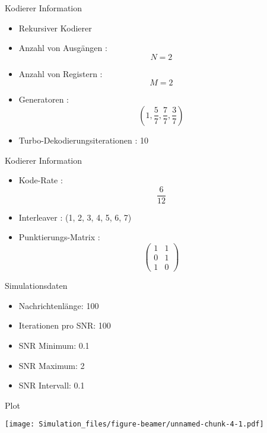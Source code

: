 \begin{frame}{Kodierer Information}

\begin{itemize}
\tightlist
\item
  Rekursiver Kodierer
\item
  Anzahl von Ausgängen : \[N=2\]
\item
  Anzahl von Registern : \[M=2\]
\item
  Generatoren : \[\left(1,\frac{5}{7},\frac{7}{7},\frac{3}{7}\right)\]
\item
  Turbo-Dekodierungsiterationen : 10
\end{itemize}

\end{frame}

\begin{frame}{Kodierer Information}

\begin{itemize}
\tightlist
\item
  Kode-Rate : \[\frac{6}{12}\]
\item
  Interleaver : (1, 2, 3, 4, 5, 6, 7)
\item
  Punktierungs-Matrix :
  \[\begin{pmatrix} 1 & 1 \\ 0 & 1 \\ 1 & 0 \end{pmatrix}\]
\end{itemize}

\end{frame}

\begin{frame}{Simulationsdaten}

\begin{itemize}
\tightlist
\item
  Nachrichtenlänge: 100
\item
  Iterationen pro SNR: 100
\item
  SNR Minimum: 0.1
\item
  SNR Maximum: 2
\item
  SNR Intervall: 0.1
\end{itemize}

\end{frame}

\begin{frame}{Plot}

\texttt{[image: Simulation\_files/figure-beamer/unnamed-chunk-4-1.pdf]}

\end{frame}
